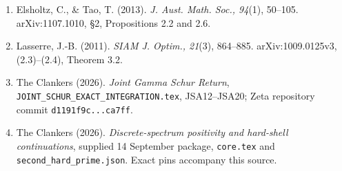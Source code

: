 \documentclass[10pt,a4paper]{article}
\begin{document}
\begingroup\footnotesize
\begin{enumerate}
\item Elsholtz, C., \& Tao, T. (2013). \emph{J. Aust. Math. Soc., 94}(1), 50--105.
  arXiv:1107.1010, \S2, Propositions 2.2 and 2.6.
\item Lasserre, J.-B. (2011). \emph{SIAM J. Optim., 21}(3), 864--885.
  arXiv:1009.0125v3, (2.3)--(2.4), Theorem 3.2.
\item The Clankers (2026). \emph{Joint Gamma Schur Return},
  \texttt{JOINT\_SCHUR\_EXACT\_INTEGRATION.tex}, JSA12--JSA20;
  Zeta repository commit \texttt{d1191f9c...ca7ff}.
\item The Clankers (2026). \emph{Discrete-spectrum positivity and hard-shell
  continuations}, supplied 14 September package, \texttt{core.tex} and
  \texttt{second\_hard\_prime.json}. Exact pins accompany this source.
\end{enumerate}
\endgroup
\end{document}

